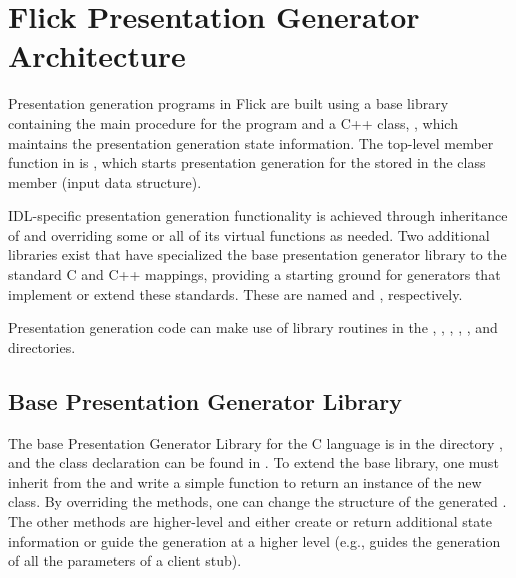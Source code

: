 \section{Flick Presentation Generator Architecture}
\label{sec:PG:Flick Presentation Generator Architecture}

Presentation generation programs in Flick are built using a base library
containing the main procedure for the program and a C++ class,
, which maintains the presentation generation state
information.  The top-level member function in  is
, which starts presentation generation for the \AOI{} stored
in the class member  (input \AOI{} data structure).

IDL-specific presentation generation functionality is achieved through
inheritance of  and overriding some or all of its virtual
functions as needed.  Two additional libraries exist that have specialized the
base presentation generator library to the standard \CORBA{} C and C++
mappings, providing a starting ground for generators that implement or extend
these \CORBA{} standards.  These are named  and
, respectively.

Presentation generation code can make use of library routines in the
, , ,
, , and 
directories.



\subsection{Base Presentation Generator Library}
\label{subsec:PG:Base Presentation Generator Library}

The base Presentation Generator Library for the C language is in the directory
, and the class declaration can be found in
.  To extend the base library, one must inherit from the
 and write a simple  function to
return an instance of the new class.  By overriding the 
methods, one can change the structure of the generated \PRESC{}\@.  The other
methods are higher-level and either create or return additional state
information or guide the \PRESC{} generation at a higher level
(e.g.,  guides the generation of all the
parameters of a client stub).

